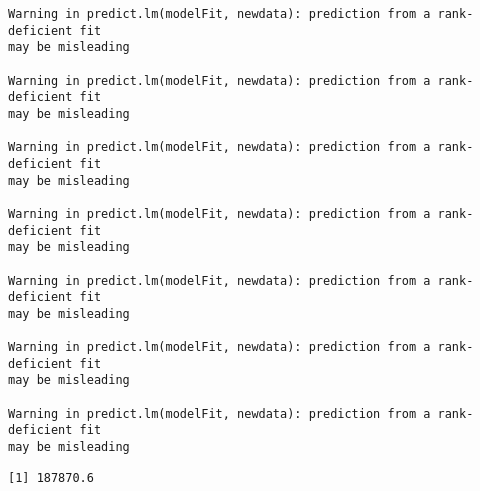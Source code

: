 \documentclass[
  letterpaper,
  DIV=11,
  numbers=noendperiod]{scrartcl}
\begin{document}
\begin{verbatim}
Warning in predict.lm(modelFit, newdata): prediction from a rank-deficient fit
may be misleading

Warning in predict.lm(modelFit, newdata): prediction from a rank-deficient fit
may be misleading

Warning in predict.lm(modelFit, newdata): prediction from a rank-deficient fit
may be misleading

Warning in predict.lm(modelFit, newdata): prediction from a rank-deficient fit
may be misleading

Warning in predict.lm(modelFit, newdata): prediction from a rank-deficient fit
may be misleading

Warning in predict.lm(modelFit, newdata): prediction from a rank-deficient fit
may be misleading

Warning in predict.lm(modelFit, newdata): prediction from a rank-deficient fit
may be misleading
\end{verbatim}

\begin{verbatim}
[1] 187870.6
\end{verbatim}
\end{document}
